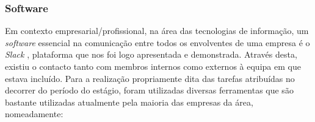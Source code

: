 \documentclass{article}
\begin{document}
\subsubsection{Software}
\hspace*{0.5cm} Em contexto empresarial/profissional, na área das tecnologias de informação, um \emph{software} essencial na comunicação entre todos os envolventes de uma empresa é o \emph{Slack} \cite{slack}, plataforma que nos foi logo apresentada e demonstrada. Através desta, existiu o contacto tanto com membros internos como externos à equipa em que estava incluído. \newline
\hspace*{0.5cm} Para a realização propriamente dita das tarefas atribuídas no decorrer do período do estágio, foram utilizadas diversas ferramentas que são bastante utilizadas atualmente pela maioria das empresas da área, nomeadamente:
\end{document}
